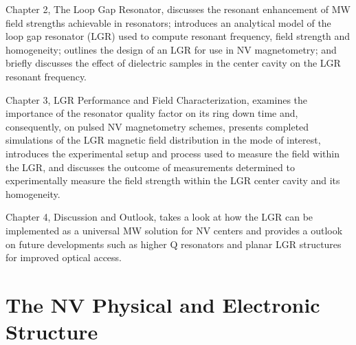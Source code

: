 Chapter 2, The Loop Gap Resonator, discusses the resonant enhancement of MW field strengths achievable in resonators; introduces an analytical model of the loop gap resonator (LGR) used to compute resonant frequency, field strength and homogeneity; outlines the design of an LGR for use in NV magnetometry; and briefly discusses the effect of dielectric samples in the center cavity on the LGR resonant frequency.


Chapter 3, LGR Performance and Field Characterization, examines the importance of the resonator quality factor on its ring down time and, consequently, on pulsed NV magnetometry schemes, presents completed simulations of the LGR magnetic field distribution in the mode of interest, introduces the experimental setup and process used to measure the field within the LGR, and discusses the outcome of measurements determined to experimentally measure the field strength within the LGR center cavity and its homogeneity.  

Chapter 4, Discussion and Outlook, takes a look at how the LGR can be implemented as a universal MW solution for NV centers and   provides a outlook on future developments such as higher Q resonators and planar LGR structures for improved optical access.


\section{The NV Physical and Electronic Structure} \label{sec:NVP}


